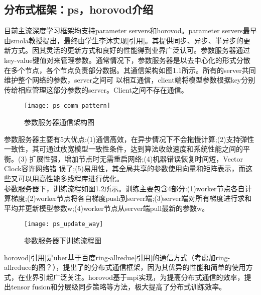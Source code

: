 \subsection{分布式框架：ps，horovod介绍}
目前主流深度学习框架均支持parameter servers和horovod。parameter servers最早由smola教授提出，最终由学生李沐实现[引用]。其提供同步、异步、半异步的更新方式。因其灵活的更新方式和良好的性能得到业界广泛认可。参数服务器通过key-value键值对来管理参数。通常情况下，参数服务器是以去中心化的形式分散在多个节点，各个节点负责部分数据。其通信架构如图1.1所示。所有的server共同维护整个网络的参数，server之间可 以相互通信，client端将模型参数根据key分别传给相应管理这部分参数的server。Client之间不存在通信。\\
\begin{figure}[htp]
\centering
\texttt{[image: ps\_comm\_pattern]}
\caption{参数服务器通信架构图}
\end{figure}
参数服务器主要有5大优点:(1)通信高效，在异步情况下不会拖慢计算;(2)支持弹性一致性，其可通过放宽模型一致性条件，达到算法收敛速度和系统性能之间的平衡。(3) 扩展性强，增加节点时无需重启网络;(4)机器错误恢复时间短，Vector Clock容许网络错 误了;(5)易用性，其全局共享的参数使用向量和矩阵表示，而这些又可以用高性能多线程库进行优化。\\
参数服务器下，训练流程如图1.2所示。训练主要包含4部分:(1)worker节点各自计算梯度;(2)worker节点将各自梯度push到server端;(3)server端对所有梯度进行求和平均并更新模型参数w;(4)worker节点从server端pull最新的参数w。\\
\begin{figure}[htp]
\centering
\texttt{[image: ps\_update\_way]}
\caption{参数服务器下训练流程图}
\end{figure}
horovod[引用]是uber基于百度ring-allredue[引用]的通信方式（考虑加ring-allreduce的图？），提出了的分布式通信框架，因为其优异的性能和简单的使用方式，在业界引起广泛关注。horovod基于mpi实现，为提高分布式通信的效率，提出tensor fusion和分层级同步策略等方法，极大提高了分布式训练效率。


